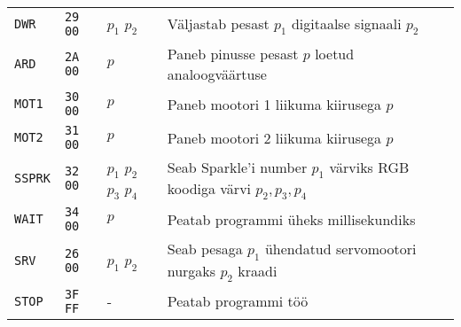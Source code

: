 \begin{longtable}{l|l|l|X}
	\texttt{DWR} & \texttt{29 00} & $p_1$ $p_2$ & Väljastab pesast $p_1$ digitaalse signaali $p_2$ \\
	\texttt{ARD} & \texttt{2A 00} & $p$ & Paneb pinusse pesast $p$ loetud analoogväärtuse \\
	\texttt{MOT1} & \texttt{30 00} & $p$ & Paneb mootori 1 liikuma kiirusega $p$ \\
	\texttt{MOT2} & \texttt{31 00} & $p$ & Paneb mootori 2 liikuma kiirusega $p$ \\
	\texttt{SSPRK} & \texttt{32 00} & $p_1$ $p_2$ $p_3$ $p_4$ & Seab Sparkle'i number $p_1$ värviks RGB koodiga värvi $p_2, p_3, p_4$ \\
	\texttt{WAIT} & \texttt{34 00} & $p$ & Peatab programmi üheks millisekundiks \\
	\texttt{SRV} & \texttt{26 00} & $p_1$ $p_2$ & Seab pesaga $p_1$ ühendatud servomootori nurgaks $p_2$ kraadi \\
	\texttt{STOP} & \texttt{3F FF} & - & Peatab programmi töö	
\end{longtable}